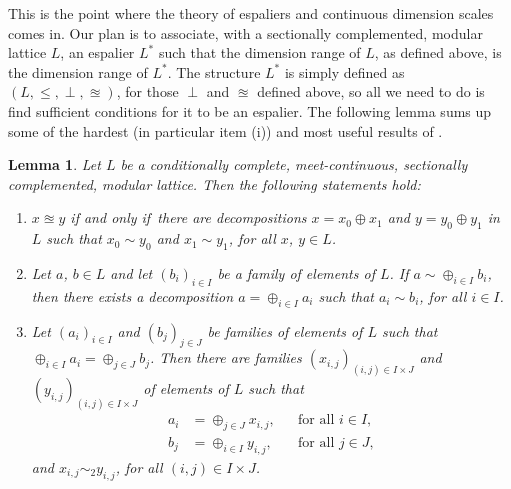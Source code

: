 \documentclass[psamsfonts,reqno]{memo-l}
\theoremstyle{plain}
\newtheorem{lemma}{Lemma}[section]
\theoremstyle{definition}
\theoremstyle{remark}
\numberwithin{equation}{section}
\renewcommand{\iff}{if and only if}
\newcommand{\famm}[2]{(#1)_{#2}}
\begin{document}
This is the point where the theory of espaliers
and continuous dimension scales comes
in. Our plan is to associate, with a sectionally complemented, modular
lattice
$L$, an espalier $L^*$ such that the dimension
range of $L$, as defined above, is the dimension
range of $L^*$. The structure
$L^*$ is simply defined as $(L,\leq,\perp,\approxeq)$, for those $\perp$ and
$\approxeq$ defined above, so all we need to do is find sufficient
conditions for it to be an espalier. The following lemma
sums up some of the hardest (in particular item (i)) and most useful results
of \cite{WDim}.

\begin{lemma}\label{L:LattInfRef}
Let $L$ be a conditionally complete, meet-continuous, sectionally
complemented, modular
 lattice. Then the
following statements hold:
\begin{enumerate}
\item $x\approxeq y$ \iff\ there are decompositions
$x=x_0\oplus x_1$ and $y=y_0\oplus y_1$ in $L$ such that $x_0\sim y_0$ and
$x_1\sim y_1$, for all $x$, $y\in L$.

\item Let $a$, $b\in L$ and let $\famm{b_i}{i\in I}$ be a family of elements
of $L$. If $a\sim\oplus_{i\in I}b_i$, then there exists a decomposition
$a=\oplus_{i\in I}a_i$ such that $a_i\sim b_i$, for all $i\in I$.

\item Let $\famm{a_i}{i\in I}$ and $\famm{b_j}{j\in J}$ be families of
elements of $L$ such that $\oplus_{i\in I}a_i=\oplus_{j\in J}b_j$. Then there
are families $\famm{x_{i,j}}{(i,j)\in I\times J}$ and
$\famm{y_{i,j}}{(i,j)\in I\times J}$ of elements of $L$ such that
   \begin{align*}
   a_i&=\oplus_{j\in J}x_{i,j},&&\text{for all }i\in I,\\
   b_j&=\oplus_{i\in I}y_{i,j},&&\text{for all }j\in J,
   \end{align*}
and $x_{i,j}\sim_2y_{i,j}$, for all $(i,j)\in I\times J$.
\end{enumerate}
\end{lemma}
\end{document}
